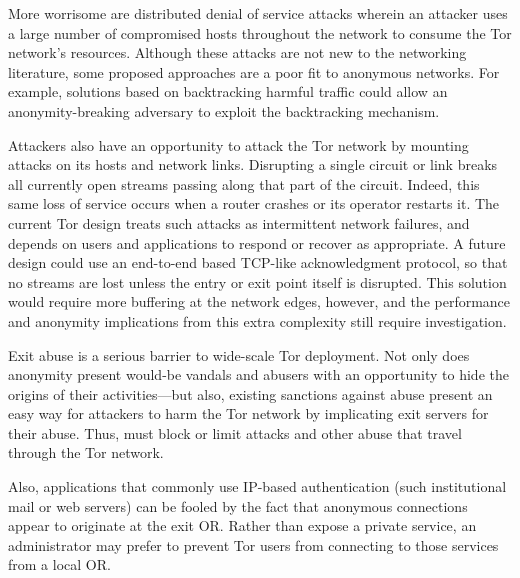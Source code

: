 \documentclass[times,10pt,twocolumn]{article}
\begin{document}

More worrisome are distributed denial of service attacks wherein an
attacker uses a large number of compromised hosts throughout the network
to consume the Tor network's resources.  Although these attacks are not
new to the networking literature, some proposed approaches are a poor
fit to anonymous networks.  For example, solutions based on backtracking
harmful traffic \cite{XXX} could allow an anonymity-breaking
adversary to exploit the backtracking mechanism.

Attackers also have an opportunity to attack the Tor network by mounting
attacks on its hosts and network links. Disrupting a single circuit or
link breaks all currently open streams passing along that part of the
circuit. Indeed, this same loss of service occurs when a router crashes
or its operator restarts it. The current Tor design treats such attacks
as intermittent network failures, and depends on users and applications
to respond or recover as appropriate. A future design could use an
end-to-end based TCP-like acknowledgment protocol, so that no streams are
lost unless the entry or exit point itself is disrupted. This solution
would require more buffering at the network edges, however, and the
performance and anonymity implications from this extra complexity still
require investigation.

\label{subsec:exitpolicies}

Exit abuse is a serious barrier to wide-scale Tor deployment.  Not
only does anonymity present would-be vandals and abusers with an
opportunity to hide the origins of their activities---but also,
existing sanctions against abuse present an easy way for attackers to
harm the Tor network by implicating exit servers for their abuse.
Thus, must block or limit attacks and other abuse that travel through
the Tor network.

Also, applications that commonly use IP-based authentication (such
institutional mail or web servers) can be fooled by the fact that
anonymous connections appear to originate at the exit OR.  Rather than
expose a private service, an administrator may prefer to prevent Tor
users from connecting to those services from a local OR.
\end{document}

